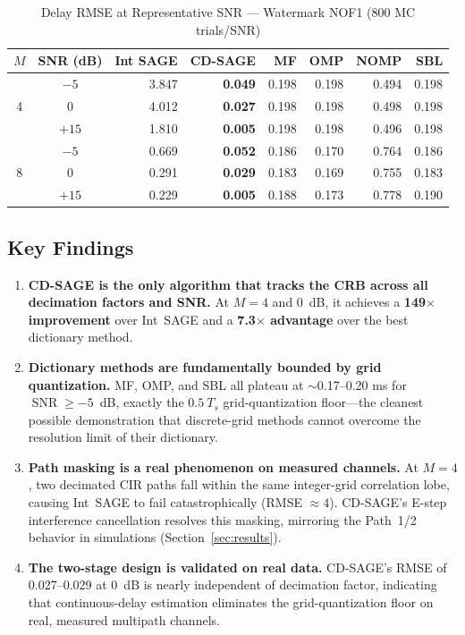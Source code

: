 \documentclass[a4paper,fleqn]{cas-dc}
\DeclareMathOperator{\SNR}{SNR}
\begin{document}
\begin{table}[cols=8,pos=htbp]
\centering
\caption{Delay RMSE at Representative SNR --- Watermark NOF1 (800 MC trials/SNR)}
\label{tab:wm}
\footnotesize
\begin{tabular}{@{}ccrrrrrr@{}}
\toprule
$M$ & SNR (dB) & Int SAGE & \textbf{CD-SAGE} & MF & OMP & NOMP & SBL \\
\midrule
\multirow{3}{*}{4} & $-5$  & 3.847 & \textbf{0.049} & 0.198 & 0.198 & 0.494 & 0.198 \\
                    & $0$   & 4.012 & \textbf{0.027} & 0.198 & 0.198 & 0.498 & 0.198 \\
                    & $+15$ & 1.810 & \textbf{0.005} & 0.198 & 0.198 & 0.496 & 0.198 \\
\midrule
\multirow{3}{*}{8} & $-5$  & 0.669 & \textbf{0.052} & 0.186 & 0.170 & 0.764 & 0.186 \\
                    & $0$   & 0.291 & \textbf{0.029} & 0.183 & 0.169 & 0.755 & 0.183 \\
                    & $+15$ & 0.229 & \textbf{0.005} & 0.188 & 0.173 & 0.778 & 0.190 \\
\bottomrule
\end{tabular}
\end{table}

\subsection{Key Findings}

\begin{enumerate}
\item \textbf{CD-SAGE is the only algorithm that tracks the CRB across all decimation factors and SNR.} At $M=4$ and \SI{0}{dB}, it achieves a \textbf{149$\times$ improvement} over Int~SAGE and a \textbf{7.3$\times$ advantage} over the best dictionary method.
\item \textbf{Dictionary methods are fundamentally bounded by grid quantization.} MF, OMP, and SBL all plateau at $\sim$0.17--0.20 ms for $\SNR \ge -5$~dB, exactly the $0.5\ T_s$ grid-quantization floor---the cleanest possible demonstration that discrete-grid methods cannot overcome the resolution limit of their dictionary.
\item \textbf{Path masking is a real phenomenon on measured channels.} At $M=4$, two decimated CIR paths fall within the same integer-grid correlation lobe, causing Int~SAGE to fail catastrophically (RMSE $\approx 4$). CD-SAGE's E-step interference cancellation resolves this masking, mirroring the Path~1/2 behavior in simulations (Section~\ref{sec:results}).
\item \textbf{The two-stage design is validated on real data.} CD-SAGE's RMSE of 0.027--0.029 at \SI{0}{dB} is nearly independent of decimation factor, indicating that continuous-delay estimation eliminates the grid-quantization floor on real, measured multipath channels.
\end{enumerate}
\end{document}

